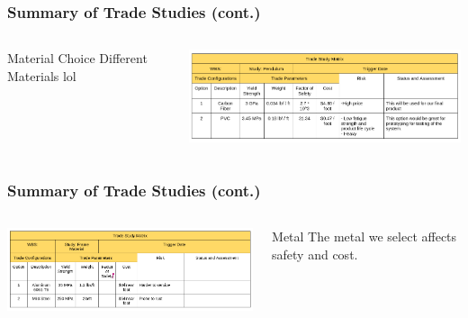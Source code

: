 \documentclass[aspectratio=169]{beamer}
\begin{document}
\begin{frame}
    \frametitle{Summary of Trade Studies (cont.)}

    \begin{columns}
        \begin{column}{0.28\textwidth}
            \begin{block}{Material Choice}
                Different Materials lol
            \end{block}
        \end{column}

        \begin{column}{0.70\textwidth}
            \includegraphics[width=10.5cm]{MaterialTradeStudy}
        \end{column}
    \end{columns}

\end{frame}

\begin{frame}
    \frametitle{Summary of Trade Studies (cont.)}

    \begin{columns}
        \begin{column}{0.70\textwidth}
            \includegraphics[width=10.5cm]{MetalTradeStudy}
        \end{column}

        \begin{column}{0.28\textwidth}
            \begin{block}{Metal}
                The metal we select affects safety and cost.
            \end{block}
        \end{column}
    \end{columns}

\end{frame}
\end{document}
